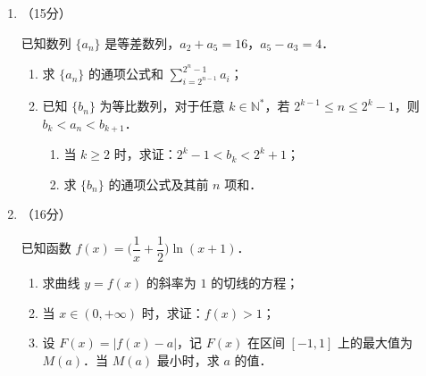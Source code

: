 \begin{description}
\begin{enumerate}[leftmargin=5pt]
        \item （15分）

        已知数列 $\{a_n\}$ 是等差数列，$a_2+a_5=16$，$a_5-a_3=4$．

        \begin{enumerate}[label=(\arabic*)]
            \item 求 $\{a_n\}$ 的通项公式和 $\displaystyle\sum_{i=2^{n-1}}^{2^n-1}a_i$；
            \item 已知 $\{b_n\}$ 为等比数列，对于任意 $k\in\mathbb{N}^*$，若 $2^{k-1}\leqslant n\leqslant2^k-1$，则 $b_k<a_n<b_{k+1}$．
            \begin{enumerate}[label=(\roman*)]
                \item 当 $k\geqslant2$ 时，求证：$2^k-1<b_k<2^k+1$；
                \item 求 $\{b_n\}$ 的通项公式及其前 $n$ 项和．
            \end{enumerate}
        \end{enumerate}

        \item （16分）

        已知函数 $f(x)=\bigl(\dfrac{1}{x}+\dfrac{1}{2}\bigr)\ln(x+1)$．

        \begin{enumerate}[label=(\arabic*)]
            \item 求曲线 $y=f(x)$ 的斜率为 $1$ 的切线的方程；
            \item 当 $x\in(0,+\infty)$ 时，求证：$f(x)>1$；
            \item 设 $F(x)=|f(x)-a|$，记 $F(x)$ 在区间 $[-1,1]$ 上的最大值为 $M(a)$．当 $M(a)$ 最小时，求 $a$ 的值．
        \end{enumerate}
    \end{enumerate}
\end{description}
\clearpage

